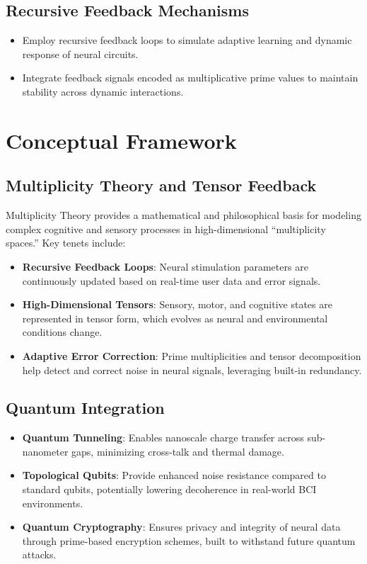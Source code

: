\documentclass{article}
\theoremstyle{plain}
\begin{document}
\subsection{Recursive Feedback Mechanisms}
\begin{itemize}
    \item Employ recursive feedback loops to simulate adaptive learning and dynamic response of neural circuits.
    \item Integrate feedback signals encoded as multiplicative prime values to maintain stability across dynamic interactions.
\end{itemize}

\section{Conceptual Framework}

\subsection{Multiplicity Theory and Tensor Feedback}
Multiplicity Theory provides a mathematical and philosophical basis for modeling complex cognitive and sensory processes in high-dimensional “multiplicity spaces.” Key tenets include:
\begin{itemize}
    \item \textbf{Recursive Feedback Loops}: Neural stimulation parameters are continuously updated based on real-time user data and error signals.
    \item \textbf{High-Dimensional Tensors}: Sensory, motor, and cognitive states are represented in tensor form, which evolves as neural and environmental conditions change.
    \item \textbf{Adaptive Error Correction}: Prime multiplicities and tensor decomposition help detect and correct noise in neural signals, leveraging built-in redundancy.
\end{itemize}

\subsection{Quantum Integration}
\begin{itemize}
    \item \textbf{Quantum Tunneling}: Enables nanoscale charge transfer across sub-nanometer gaps, minimizing cross-talk and thermal damage.
    \item \textbf{Topological Qubits}: Provide enhanced noise resistance compared to standard qubits, potentially lowering decoherence in real-world BCI environments.
    \item \textbf{Quantum Cryptography}: Ensures privacy and integrity of neural data through prime-based encryption schemes, built to withstand future quantum attacks.
\end{itemize}
\end{document}
